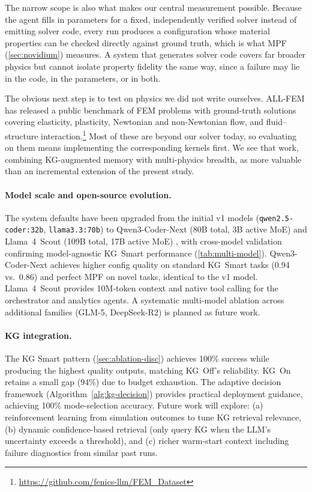 \documentclass[twocolumn]{article}
\newif\ifrevisionsvisible
\newcommand{\revised}[1]{%
  \ifrevisionsvisible\textcolor{revisionred}{#1}\else#1\fi}
\begin{document}
\revised{The narrow scope is also what makes our central measurement
possible.  Because the agent fills in parameters for a fixed,
independently verified solver instead of emitting solver code, every run
produces a configuration whose material properties can be checked
directly against ground truth, which is what MPF (\cref{sec:novidium})
measures.  A system that generates solver code covers far broader physics
but cannot isolate property fidelity the same way, since a failure may
lie in the code, in the parameters, or in both.}

\revised{The obvious next step is to test on physics we did not write
ourselves.  ALL-FEM \citep{deotale2026allfem} has released a public
benchmark of FEM problems with ground-truth solutions covering
elasticity, plasticity, Newtonian and non-Newtonian flow, and
fluid--structure
interaction.\footnote{\url{https://github.com/fenics-llm/FEM_Dataset}}
Most of these are beyond our solver today, so evaluating on them means
implementing the corresponding kernels first.  We see that work,
combining KG-augmented memory with multi-physics breadth, as more
valuable than an incremental extension of the present study.}

\paragraph{Model scale and open-source evolution.}
The system defaults have been upgraded from the initial v1 models
(\texttt{qwen2.5-coder:32b}, \texttt{llama3.3:70b}) to
Qwen3-Coder-Next (80B total, 3B active MoE) \citep{qwen3coder2026}
and Llama~4~Scout (109B total, 17B active MoE) \citep{llama4}, with
cross-model validation confirming model-agnostic KG~Smart performance
(\cref{tab:multi-model}).  Qwen3-Coder-Next achieves higher config
quality on standard KG~Smart tasks (0.94 vs.\ 0.86) and perfect MPF on
novel tasks, identical to the v1 model.  Llama~4~Scout provides 10M-token
context and native tool calling for the orchestrator and analytics agents.
A systematic multi-model ablation across additional families (GLM-5,
DeepSeek-R2) is planned as future work.

\paragraph{KG integration.}
The KG Smart pattern (\cref{sec:ablation-disc}) achieves 100\% success
while producing the highest quality outputs, matching KG~Off's
reliability.  KG~On retains a small gap (94\%) due to budget exhaustion.
The adaptive decision framework (Algorithm~\ref{alg:kg-decision}) provides
practical deployment guidance, achieving 100\% mode-selection accuracy.
Future work will explore:
(a) reinforcement learning from simulation outcomes to tune KG retrieval
relevance, (b) dynamic confidence-based retrieval (only query KG when the
LLM's uncertainty exceeds a threshold), and (c) richer warm-start context
including failure diagnostics from similar past runs.
\end{document}
